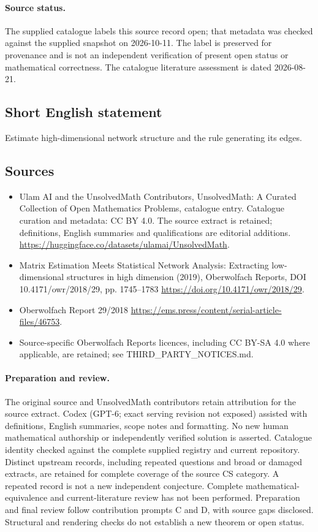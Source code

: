 \documentclass[11pt]{article}
\begin{document}
\paragraph{Source status.}
The supplied catalogue labels this source record open; that metadata was checked against the supplied snapshot on 2026-10-11. The label is preserved for provenance and is not an independent verification of present open status or mathematical correctness. The catalogue literature assessment is dated 2026-08-21.
\subsection{Short English statement}
Estimate high-dimensional network structure and the rule generating its edges.
\subsection{Sources}
\begin{itemize}
\item[S1] Ulam AI and the UnsolvedMath Contributors, UnsolvedMath: A Curated Collection of Open Mathematics Problems, catalogue entry. Catalogue curation and metadata: CC BY 4.0. The source extract is retained; definitions, English summaries and qualifications are editorial additions.
\url{https://huggingface.co/datasets/ulamai/UnsolvedMath}.
\item[S2] Matrix Estimation Meets Statistical Network Analysis: Extracting low-dimensional structures in high dimension (2019), Oberwolfach Reports, DOI 10.4171/owr/2018/29, pp. 1745--1783
\url{https://doi.org/10.4171/owr/2018/29}.
\item[S3] Oberwolfach Report 29/2018
\url{https://ems.press/content/serial-article-files/46753}.
\item Source-specific Oberwolfach Reports licences, including CC BY-SA 4.0 where applicable, are retained; see THIRD\_PARTY\_NOTICES.md.
\end{itemize}
\paragraph{Preparation and review.}
The original source and UnsolvedMath contributors retain attribution for the source extract. Codex (GPT-6; exact serving revision not exposed) assisted with definitions, English summaries, scope notes and formatting. No new human mathematical authorship or independently verified solution is asserted. Catalogue identity checked against the complete supplied registry and current repository. Distinct upstream records, including repeated questions and broad or damaged extracts, are retained for complete coverage of the source CS category. A repeated record is not a new independent conjecture. Complete mathematical-equivalence and current-literature review has not been performed. Preparation and final review follow contribution prompts C and D, with source gaps disclosed. Structural and rendering checks do not establish a new theorem or open status.
\label{end:statement}
\end{document}
